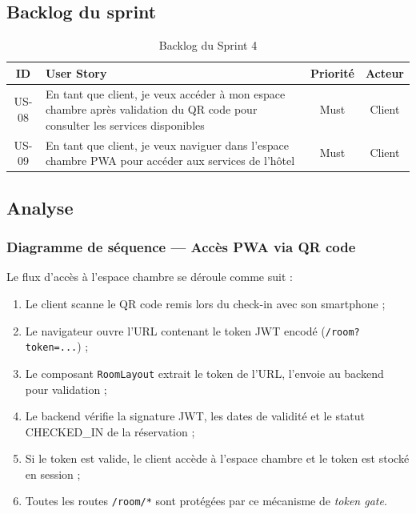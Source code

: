 \subsection{Backlog du sprint}

\begin{table}[H]
\centering
\caption{Backlog du Sprint 4}
\label{tab:backlog_sprint4}
\begin{tabular}{|c|p{9cm}|c|c|}
\hline
\textbf{ID} & \textbf{User Story} & \textbf{Priorité} & \textbf{Acteur} \\
\hline
US-08 & En tant que client, je veux accéder à mon espace chambre après validation du QR code pour consulter les services disponibles & Must & Client \\
\hline
US-09 & En tant que client, je veux naviguer dans l'espace chambre PWA pour accéder aux services de l'hôtel & Must & Client \\
\hline
\end{tabular}
\end{table}

\subsection{Analyse}

\subsubsection{Diagramme de séquence — Accès PWA via QR code}


Le flux d'accès à l'espace chambre se déroule comme suit :
\begin{enumerate}
  \item Le client scanne le QR code remis lors du check-in avec son smartphone ;
  \item Le navigateur ouvre l'URL contenant le token JWT encodé (\texttt{/room?token=...}) ;
  \item Le composant \texttt{RoomLayout} extrait le token de l'URL, l'envoie au backend pour validation ;
  \item Le backend vérifie la signature JWT, les dates de validité et le statut CHECKED\_IN de la réservation ;
  \item Si le token est valide, le client accède à l'espace chambre et le token est stocké en session ;
  \item Toutes les routes \texttt{/room/*} sont protégées par ce mécanisme de \textit{token gate}.
\end{enumerate}


